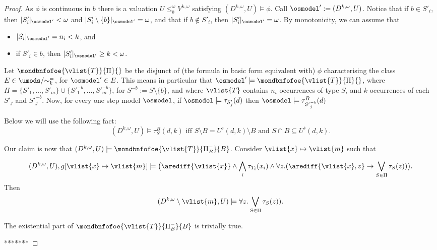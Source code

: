\begin{proof}
As $\phi$ is continuous in $b$ there is a valuation $U \leq^{\omega}_{b} V^{k, \omega}$ 
satisfying $(D^{k, \omega}, U) \models \phi$.  
 Call $\osmodel':=(D^{k, \omega}, U)$. Notice that if $b \in S'_i$, then $|S'_i|_{\osmodel'} < \omega$ and $|S'_i\setminus \{b\} |_{\osmodel'} = \omega$, and that if $b \notin S'_i$, then $|S'_i|_{\osmodel'}= \omega$. 
   By monotonicity, we can assume that
   \begin{itemize}
   \item    $|S_i|_{\osmodel'} = n_i< k$, and
   \item if $S'_i \in b$, then $|S'_i|_{\osmodel'}\geq k < \omega$.
   \end{itemize}
   Let $\mondbnfofoe{\vlist{T}}{\Pi}{}$ be the disjunct of (the formula in basic form equivalent with) $\phi$ characterising the class $E \in \umods/{\sim^=_k}$, for ${\osmodel'}\in E$. This means in particular that  ${\osmodel'} \models\mondbnfofoe{\vlist{T}}{\Pi}{}$, where
   $\Pi= \{S'_1,\dots,S'_m\} \cup \{{S'}_1^{-b},\dots,{S'}_m^{-b}\}$, 
   for $S^{-b}:= S \setminus \{b\}$, and where $\vlist{T}$ contains  $n_i$ occurrences of type $S_i$ 
and $k$ occurrences of each $S'_j$ and ${S'}_j^{-b}$. Now, for every one step model $\osmodel$, if ${\osmodel} \models \tau_{S'_j}(d)$ then ${\osmodel} \models \tau^B_{{S'}_j^{-b}}(d)$




Below we will use the following fact:
\begin{equation}
\label{eq:conofoe101}
(D^{k, \omega}, U) \models \tau^{B}_{S}(d,k) \text{ iff }
S \setminus B = U^{\flat}(d,k) \setminus B \text{ and }
S \cap B \subseteq U^{\flat}(d,k).
\end{equation}

Our claim is now that $(D^{k, \omega}, U) \models 
 \mondbnfofoe{\vlist{T}}{\Pi^{-}_{B}}{B} $.  Consider $ \vlist{x} \mapsto \vlist{m}$ such that
 
 \[(D^{k, \omega}, U), g[\vlist{x} \mapsto \vlist{m}] \models \big(\arediff{\vlist{x}} \land \bigwedge_i \tau_{T_i}(x_i)   \land \forall z.(\arediff{\vlist{x},z}  \to \bigvee_{S\in \Pi} \tau_S(z))\big).\]
 Then 
 \[(D^{k, \omega}\setminus \vlist{m}, U) \models \forall z.\bigvee_{S\in \Pi} \tau_S(z)).\]

The existential part of $ \mondbnfofoe{\vlist{T}}{\Pi^{-}_{B}}{B} $ is trivially 
true. 


*******


\end{proof}
